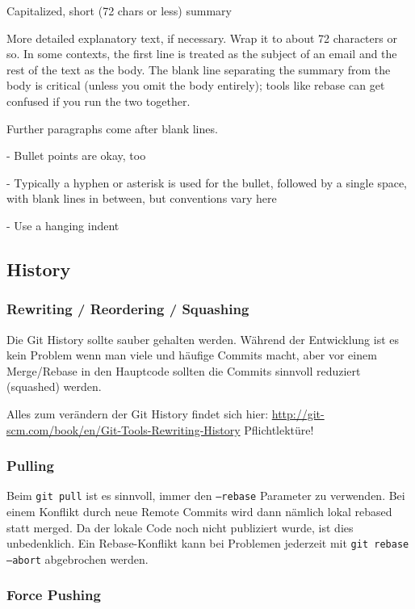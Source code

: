 \begin{textcode}
Capitalized, short (72 chars or less) summary

More detailed explanatory text, if necessary.  Wrap it to about 72
characters or so.  In some contexts, the first line is treated as the
subject of an email and the rest of the text as the body. The blank
line separating the summary from the body is critical (unless you omit
the body entirely); tools like rebase can get confused if you run the
two together.

Further paragraphs come after blank lines.

- Bullet points are okay, too

- Typically a hyphen or asterisk is used for the bullet, followed by a
  single space, with blank lines in between, but conventions vary here

- Use a hanging indent
\end{textcode}

\subsection{History}

\subsubsection{Rewriting / Reordering / Squashing}

Die Git History sollte sauber gehalten werden. Während der Entwicklung ist es
kein Problem wenn man viele und häufige Commits macht, aber vor einem
Merge/Rebase in den Hauptcode sollten die Commits sinnvoll reduziert (squashed)
werden. 

Alles zum verändern der Git History findet sich hier:
\url{http://git-scm.com/book/en/Git-Tools-Rewriting-History} Pflichtlektüre!

\subsubsection{Pulling}

Beim \texttt{git pull} ist es sinnvoll, immer den \texttt{--rebase} Parameter zu
verwenden. Bei einem Konflikt durch neue Remote Commits wird dann nämlich lokal
rebased statt merged. Da der lokale Code noch nicht publiziert wurde, ist dies
unbedenklich. Ein Rebase-Konflikt kann bei Problemen jederzeit mit \texttt{git
rebase --abort} abgebrochen werden.

\subsubsection{Force Pushing}

